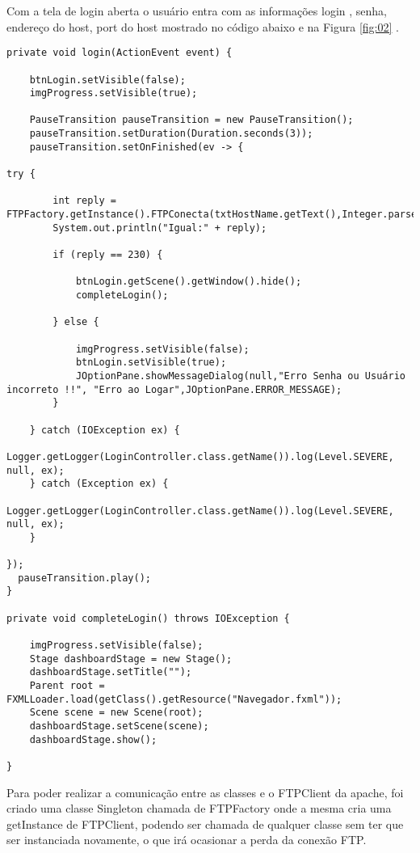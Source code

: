 \documentclass[12pt]{article}
\begin{document}
Com a tela de login aberta o usuário entra com as informações login , senha, endereço do host, port do host mostrado no código abaixo e na Figura \ref{fig:02} .
\vspace{.4cm}
\begin{lstlisting}
private void login(ActionEvent event) {

	btnLogin.setVisible(false);
	imgProgress.setVisible(true);
	
	PauseTransition pauseTransition = new PauseTransition();
	pauseTransition.setDuration(Duration.seconds(3));
	pauseTransition.setOnFinished(ev -> {

try {
	
		int reply = FTPFactory.getInstance().FTPConecta(txtHostName.getText(),Integer.parseInt(txtHostPort.getText()),this.txtUsername.getText(),this.txtPassword.getText());
		System.out.println("Igual:" + reply);
		
		if (reply == 230) {
		
			btnLogin.getScene().getWindow().hide();
			completeLogin();
		
		} else {
		
			imgProgress.setVisible(false);
			btnLogin.setVisible(true);
			JOptionPane.showMessageDialog(null,"Erro Senha ou Usuário incorreto !!", "Erro ao Logar",JOptionPane.ERROR_MESSAGE);
		}

	} catch (IOException ex) {
		Logger.getLogger(LoginController.class.getName()).log(Level.SEVERE, null, ex);
	} catch (Exception ex) {
		Logger.getLogger(LoginController.class.getName()).log(Level.SEVERE, null, ex);
	}

});
  pauseTransition.play();
}

private void completeLogin() throws IOException {
	
	imgProgress.setVisible(false);
	Stage dashboardStage = new Stage();
	dashboardStage.setTitle("");
	Parent root = FXMLLoader.load(getClass().getResource("Navegador.fxml"));
	Scene scene = new Scene(root);
	dashboardStage.setScene(scene);
	dashboardStage.show();
	
}

\end{lstlisting}


Para poder realizar a comunicação entre as classes e o FTPClient da apache, foi criado uma classe Singleton chamada de FTPFactory onde a mesma cria uma getInstance de FTPClient, podendo ser chamada de qualquer classe sem ter que ser instanciada novamente, o que irá ocasionar a perda da conexão FTP.
\end{document}
